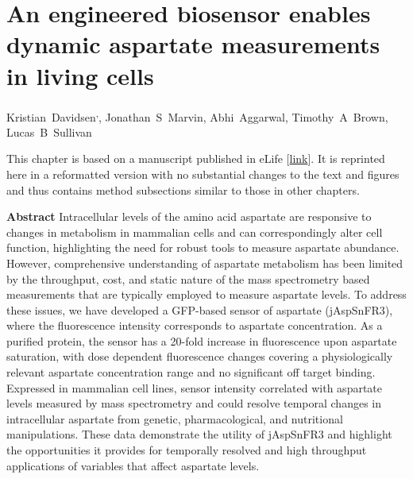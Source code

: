 \chapter{An engineered biosensor enables dynamic aspartate measurements in living cells}
\label{chap3}

\renewcommand{\thefootnote}{\fnsymbol{footnote}}
\begin{center}
    \mbox{Kristian Davidsen\footnotemark[1]\textsuperscript{,}\footnotemark[2],}
    \mbox{Jonathan S Marvin\footnotemark[3]\footnotemark[5],}
    \mbox{Abhi Aggarwal\footnotemark[3],}
    \mbox{Timothy A Brown\footnotemark[3],}
    \mbox{Lucas B Sullivan\footnotemark[1]\footnotemark[5]}
\end{center}

\setcounter{footnote}{0}
\renewcommand{\thefootnote}{\arabic{footnote}}




\noindent This chapter is based on a manuscript published in eLife [\href{https://doi.org/10.7554/eLife.90024}{link}].
It is reprinted here in a reformatted version with no substantial changes to the text and figures and thus contains method subsections similar to those in other chapters.

\vspace{20pt}
\noindent \textbf{Abstract} \newline
\noindent Intracellular levels of the amino acid aspartate are responsive to changes in metabolism in mammalian cells and can correspondingly alter cell function, highlighting the need for robust tools to measure aspartate abundance.
However, comprehensive understanding of aspartate metabolism has been limited by the throughput, cost, and static nature of the mass spectrometry based measurements that are typically employed to measure aspartate levels.
To address these issues, we have developed a GFP-based sensor of aspartate (jAspSnFR3), where the fluorescence intensity corresponds to aspartate concentration.
As a purified protein, the sensor has a 20-fold increase in fluorescence upon aspartate saturation, with dose dependent fluorescence changes covering a physiologically relevant aspartate concentration range and no significant off target binding.
Expressed in mammalian cell lines, sensor intensity correlated with aspartate levels measured by mass spectrometry and could resolve temporal changes in intracellular aspartate from genetic, pharmacological, and nutritional manipulations.
These data demonstrate the utility of jAspSnFR3 and highlight the opportunities it provides for temporally resolved and high throughput applications of variables that affect aspartate levels.



